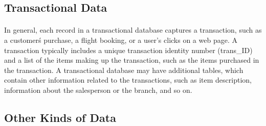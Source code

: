 \subsection{Transactional Data}
\paragraph{}
In general, each record in a transactional database captures a transaction, such as a customer\'s purchase, a
flight booking, or a user's clicks on a web page. A transaction typically includes a unique transaction identity
number (trans\_ID) and a list of the items making up the transaction, such as the items purchased in the
transaction. A transactional database may have additional tables, which contain other information related to the
transactions, such as item description, information about the salesperson or the branch, and so on.


\subsection{Other Kinds of Data}
